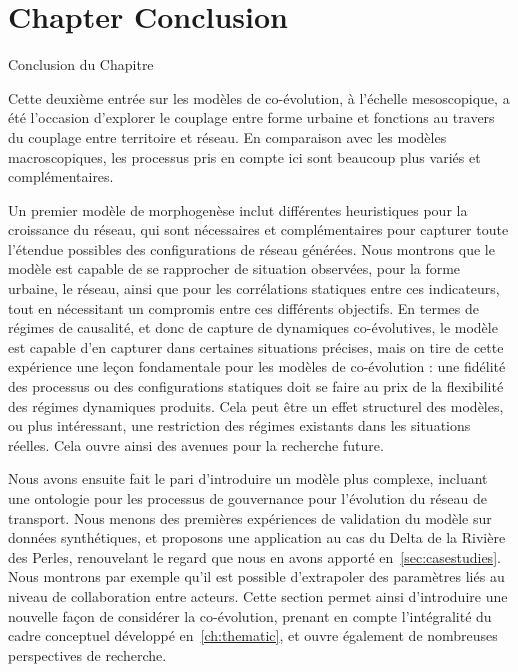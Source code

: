 

\newpage


\section*{Chapter Conclusion}{Conclusion du Chapitre}


Cette deuxième entrée sur les modèles de co-évolution, à l'échelle mesoscopique, a été l'occasion d'explorer le couplage entre forme urbaine et fonctions au travers du couplage entre territoire et réseau. En comparaison avec les modèles macroscopiques, les processus pris en compte ici sont beaucoup plus variés et complémentaires.

Un premier modèle de morphogenèse inclut différentes heuristiques pour la croissance du réseau, qui sont nécessaires et complémentaires pour capturer toute l'étendue possibles des configurations de réseau générées. Nous montrons que le modèle est capable de se rapprocher de situation observées, pour la forme urbaine, le réseau, ainsi que pour les corrélations statiques entre ces indicateurs, tout en nécessitant un compromis entre ces différents objectifs. En termes de régimes de causalité, et donc de capture de dynamiques co-évolutives, le modèle est capable d'en capturer dans certaines situations précises, mais on tire de cette expérience une leçon fondamentale pour les modèles de co-évolution : une fidélité des processus ou des configurations statiques doit se faire au prix de la flexibilité des régimes dynamiques produits. Cela peut être un effet structurel des modèles, ou plus intéressant, une restriction des régimes existants dans les situations réelles. Cela ouvre ainsi des avenues pour la recherche future.


Nous avons ensuite fait le pari d'introduire un modèle plus complexe, incluant une ontologie pour les processus de gouvernance pour l'évolution du réseau de transport. Nous menons des premières expériences de validation du modèle sur données synthétiques, et proposons une application au cas du Delta de la Rivière des Perles, renouvelant le regard que nous en avons apporté en~\ref{sec:casestudies}. Nous montrons par exemple qu'il est possible d'extrapoler des paramètres liés au niveau de collaboration entre acteurs. Cette section permet ainsi d'introduire une nouvelle façon de considérer la co-évolution, prenant en compte l'intégralité du cadre conceptuel développé en~\ref{ch:thematic}, et ouvre également de nombreuses perspectives de recherche.




\stars
